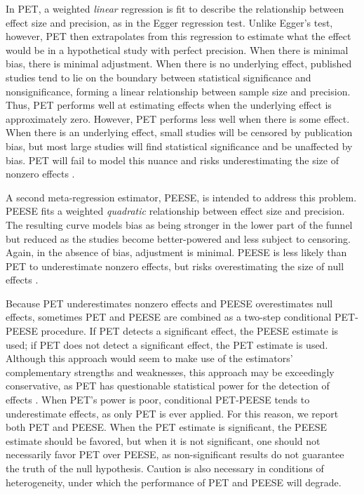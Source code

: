 \documentclass[man, mask]{apa6}
\begin{document}
In PET, a weighted {\em linear} regression is fit to describe the relationship between effect size and precision, as in the Egger regression test. Unlike Egger's test, however, PET then extrapolates from this regression to estimate what the effect would be in a hypothetical study with perfect precision. When there is minimal bias, there is minimal adjustment. When there is no underlying effect, published studies tend to lie on the boundary between statistical significance and nonsignificance, forming a linear relationship between sample size and precision. Thus, PET performs well at estimating effects when the underlying effect is approximately zero. However, PET performs less well when there is some effect. When there is an underlying effect, small studies will be censored by publication bias, but most large studies will find statistical significance and be unaffected by bias. PET will fail to model this nuance and risks underestimating the size of nonzero effects \citep{Stanley:Doucouliagos:2014}.

A second meta-regression estimator, PEESE, is intended to address this problem. PEESE fits a weighted {\em quadratic} relationship between effect size and precision. The resulting curve models bias as being stronger in the lower part of the funnel but reduced as the studies become better-powered and less subject to censoring. Again, in the absence of bias, adjustment is minimal. PEESE is less likely than PET to underestimate nonzero effects, but risks overestimating the size of null effects \citep{Stanley:Doucouliagos:2014}.

Because PET underestimates nonzero effects and PEESE overestimates null effects, sometimes PET and PEESE are combined as a two-step conditional PET-PEESE procedure. If PET detects a significant effect, the PEESE estimate is used; if PET does not detect a significant effect, the PET estimate is used. Although this approach would seem to make use of the estimators' complementary strengths and weaknesses, this approach may be exceedingly conservative, as PET has questionable statistical power for the detection of effects \citep{Gervais:2015}. When PET's power is poor, conditional PET-PEESE tends to underestimate effects, as only PET is ever applied. For this reason, we report both PET and PEESE. When the PET estimate is significant, the PEESE estimate should be favored, but when it is not significant, one should not necessarily favor PET over PEESE, as non-significant results do not guarantee the truth of the null hypothesis. Caution is also necessary in conditions of heterogeneity, under which the performance of PET and PEESE will degrade.
\end{document}
